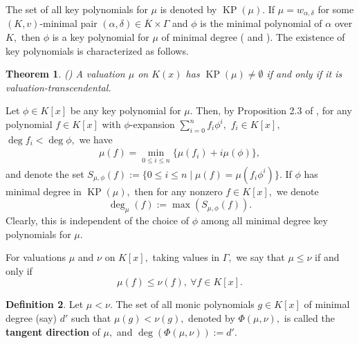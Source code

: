 \documentclass[11pt]{amsart}
\newtheorem{theorem}{Theorem}[section]
\newtheorem{lemma}[theorem]{Lemma}
\theoremstyle{definition}
\newtheorem{definition}[theorem]{Definition}
\theoremstyle{remark}
\numberwithin{equation}{section}
\begin{document}
	The set of all key polynomials for $\mu$ is denoted by $\operatorname{KP}(\mu).$ If $\mu=w_{\alpha,\delta}$ for some $(K,v)$-minimal pair $(\alpha,\delta)\in \overline{K}\times\Gamma$ and $\phi$  is the minimal polynomial of $\alpha$ over $K,$ then $\phi$ is a key polynomial for $\mu$ of minimal degree (\cite[Theorem 1.1]{JN} and \cite[Theorem 2.21]{Ma}). 
The existence of key polynomials is characterized as follows.
\begin{theorem}(\cite[Theorem 4.4]{EN4})
	A valuation $\mu$ on $K(x)$ has $\operatorname{KP}(\mu)\neq\emptyset$ if and only if it is valuation-transcendental.
\end{theorem}

		Let $\phi\in K[x]$ be  any key polynomial for $\mu$. Then, by Proposition 2.3 of \cite{EN4}, for  any polynomial $f\in K[x]$ with $\phi$-expansion $\sum_{i=0}^{n}   f_i \phi^i,$ $f_i\in K[x],$  $\deg f_i<\deg \phi,$ we have 
	\begin{align*}
		\mu(f)=\min_{0 \leq i \leq n}\{\mu(f_i)+ i\mu(\phi)\},
	\end{align*}
	and denote the set $S_{\mu,\phi}(f):=\{0\leq i\leq n\mid \mu(f)=\mu(f_i\phi^i)\}.$
	If $\phi$ has minimal degree in $\operatorname{KP}(\mu),$ then for any nonzero $f\in K[x],$ we denote   
	\[\deg_\mu(f):=\max(S_{\mu,\phi}(f)).\] Clearly, this is independent of the choice of $\phi$ among all minimal degree key polynomials for $\mu.$
	 
	For  valuations $\mu$ and $\nu$ on $K[x],$ taking values in $\Gamma,$ we say that $\mu\leq \nu$ if and only if 
	$$\mu(f)\leq \nu(f),~\forall f\in K[x].$$
	\begin{definition}
		Let $\mu<\nu.$ The set of all monic polynomials $g\in K[x]$ of minimal degree (say) $d'$ such that $\mu(g)<\nu(g),$ denoted  by $\Phi(\mu,\nu),$ is called the {\bf tangent direction} of $\mu,$ and  $\deg(\Phi(\mu,\nu)):=d'.$ 
\end{definition}
 
\end{document}
